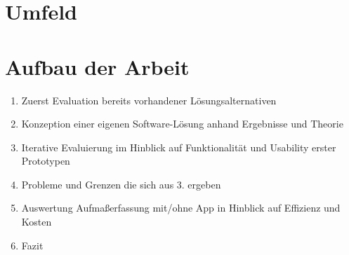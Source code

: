 \section{Umfeld}

\section{Aufbau der Arbeit}
\begin{enumerate}
	\item Zuerst Evaluation bereits vorhandener Lösungsalternativen
	\item Konzeption einer eigenen Software-Lösung anhand Ergebnisse und Theorie
	\item Iterative Evaluierung im Hinblick auf Funktionalität und Usability erster Prototypen
	\item Probleme und Grenzen die sich aus 3. ergeben
	\item Auswertung Aufmaßerfassung mit/ohne App in Hinblick auf Effizienz und Kosten
	\item Fazit
\end{enumerate}
